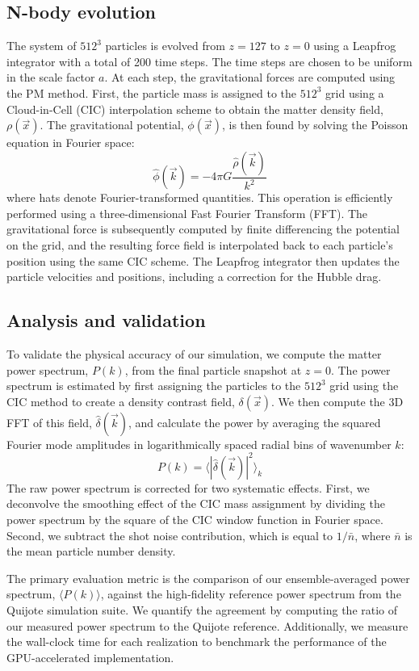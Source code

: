 \documentclass[]{article}
\begin{document}
\subsection{N-body evolution}
The system of $512^3$ particles is evolved from $z=127$ to $z=0$ using a Leapfrog integrator with a total of 200 time steps. The time steps are chosen to be uniform in the scale factor $a$. At each step, the gravitational forces are computed using the PM method. First, the particle mass is assigned to the $512^3$ grid using a Cloud-in-Cell (CIC) interpolation scheme to obtain the matter density field, $\rho(\vec{x})$. The gravitational potential, $\phi(\vec{x})$, is then found by solving the Poisson equation in Fourier space:
\begin{equation}
\hat{\phi}(\vec{k}) = -4 \pi G \frac{\hat{\rho}(\vec{k})}{k^2}
\end{equation}
where hats denote Fourier-transformed quantities. This operation is efficiently performed using a three-dimensional Fast Fourier Transform (FFT). The gravitational force is subsequently computed by finite differencing the potential on the grid, and the resulting force field is interpolated back to each particle's position using the same CIC scheme. The Leapfrog integrator then updates the particle velocities and positions, including a correction for the Hubble drag.

\subsection{Analysis and validation}
To validate the physical accuracy of our simulation, we compute the matter power spectrum, $P(k)$, from the final particle snapshot at $z=0$. The power spectrum is estimated by first assigning the particles to the $512^3$ grid using the CIC method to create a density contrast field, $\delta(\vec{x})$. We then compute the 3D FFT of this field, $\hat{\delta}(\vec{k})$, and calculate the power by averaging the squared Fourier mode amplitudes in logarithmically spaced radial bins of wavenumber $k$:
\begin{equation}
P(k) = \langle |\hat{\delta}(\vec{k})|^2 \rangle_{k}
\end{equation}
The raw power spectrum is corrected for two systematic effects. First, we deconvolve the smoothing effect of the CIC mass assignment by dividing the power spectrum by the square of the CIC window function in Fourier space. Second, we subtract the shot noise contribution, which is equal to $1/\bar{n}$, where $\bar{n}$ is the mean particle number density.

The primary evaluation metric is the comparison of our ensemble-averaged power spectrum, $\langle P(k) \rangle$, against the high-fidelity reference power spectrum from the Quijote simulation suite. We quantify the agreement by computing the ratio of our measured power spectrum to the Quijote reference. Additionally, we measure the wall-clock time for each realization to benchmark the performance of the GPU-accelerated implementation.
\end{document}

